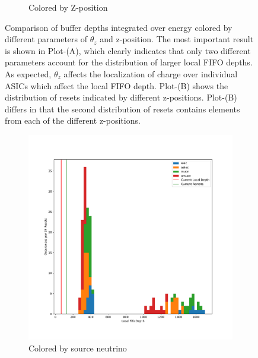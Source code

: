 \begin{figure}
\begin{subfigure}{.5\textwidth}
  \caption{Colored by Z-position}
\end{subfigure}
\caption{Comparison of buffer depths integrated over energy colored by different parameters of $\theta_{z}$ and z-position.
The most important result is shown in Plot-(A), which clearly indicates that only two different parameters account for the distribution of larger local FIFO depths.
As expected, $\theta_{z}$ affects the localization of charge over individual ASICs which affect the local FIFO depth.
Plot-(B) shows the distribution of resets indicated by different z-positions.
Plot-(B) differs in that the second distribution of resets contains elements from each of the different z-positions.
}
\label{fig:compare_integral_zpos_theta}
\end{figure}

\begin{figure}
\centering
\begin{subfigure}{.5\textwidth}
  \centering
  \includegraphics[width=\textwidth]{images/df_pdg_cut.pdf}
  \caption{Colored by source neutrino}
\end{subfigure}%
\begin{subfigure}{.5\textwidth}
  \centering

\end{subfigure}
\end{figure}
